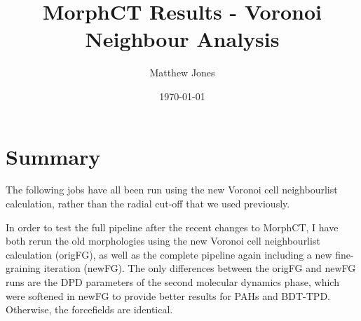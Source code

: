 \documentclass[12pt]{article}
\title{MorphCT Results - Voronoi Neighbour Analysis}
\author{Matthew Jones}
\date{\today}
\begin{document}
\maketitle

\section{Summary}

The following jobs have all been run using the new Voronoi cell neighbourlist calculation, rather than the radial cut-off that we used previously.

In order to test the full pipeline after the recent changes to MorphCT, I have both rerun the old morphologies using the new Voronoi cell neighbourlist calculation (origFG), as well as the complete pipeline again including a new fine-graining iteration (newFG).
The only differences between the origFG and newFG runs are the DPD parameters of the second molecular dynamics phase, which were softened in newFG to provide better results for PAHs and BDT-TPD.
Otherwise, the forcefields are identical.
\end{document}
